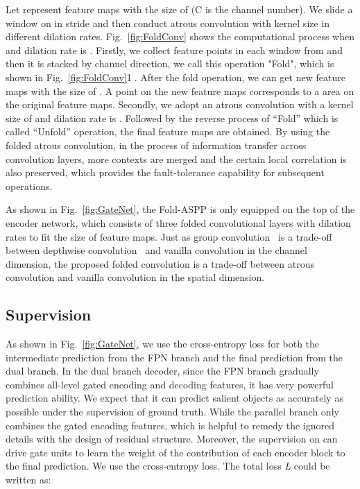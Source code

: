 \documentclass[runningheads]{llncs}
\begin{document}
	Let  represent feature maps with the size of  (C is the channel number). We slide a  window on  in stride  and then conduct atrous convolution with kernel size   in different dilation rates. Fig.~\ref{fig:FoldConv} shows the computational process when  and dilation rate is . Firstly, we collect   feature points in each window from   and then it is stacked by channel direction, we call this operation "Fold", which is shown in Fig.~\ref{fig:FoldConv}\textcircled{\scriptsize 1}. After the fold operation, we can get new feature maps with the size of . A point on the new feature maps corresponds to a  area on the original feature maps. Secondly, we adopt an atrous convolution with a kernel size of  and dilation rate is . 
Followed by the reverse process of ``Fold'' which is  called ``Unfold'' operation, the final feature maps are obtained. 
	By using the folded atrous convolution, in the process of information transfer across convolution layers, more contexts are merged and the certain local correlation is also preserved, which provides the fault-tolerance capability for subsequent operations.
	
	As shown in Fig.~\ref{fig:GateNet}, the Fold-ASPP is only equipped on the top of the encoder network, which consists of three folded convolutional layers with  dilation rates  to fit the size of feature maps. Just as group convolution~\cite{ResNext} is a trade-off between depthwise convolution~\cite{Xception,Mobilenet} and vanilla convolution in the channel dimension, the proposed folded convolution is a trade-off between atrous convolution and vanilla convolution in the spatial dimension. 
	\subsection{Supervision}\label{sec:supervision}
	As shown in Fig.~\ref{fig:GateNet}, we use the cross-entropy loss for both the intermediate prediction from the FPN branch and the final prediction from the dual branch. In the dual branch decoder, since the FPN branch gradually combines all-level gated encoding and decoding features, it has very powerful prediction ability. We expect that it can predict salient objects as accurately as possible under the supervision of ground truth. While the parallel branch only combines the gated encoding features, which is helpful to remedy the ignored details with the design of residual structure. Moreover, the supervision on  can drive gate units to learn the weight of the contribution of each encoder block to the final prediction. We use the cross-entropy loss. The total loss \emph{L} could be written as:
	
\end{document}
